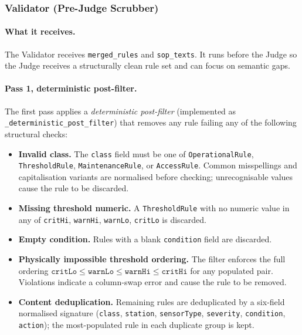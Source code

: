 ﻿\documentclass[11pt]{article}
\begin{document}
\subsubsection{Validator (Pre-Judge Scrubber)}
\label{sec:validator}

\paragraph{What it receives.}
The Validator receives \texttt{merged\_rules} and \texttt{sop\_texts}.  It runs
before the Judge so the Judge receives a structurally clean rule set and can focus
on semantic gaps.

\paragraph{Pass 1, deterministic post-filter.}
The first pass applies a \emph{deterministic post-filter} (implemented as
\texttt{\_deterministic\_post\_filter}) that removes any rule failing any of the
following structural checks:

\begin{itemize}
    \item \textbf{Invalid class.}  The \texttt{class} field must be one of
          \texttt{OperationalRule}, \texttt{ThresholdRule}, \texttt{MaintenanceRule},
          or \texttt{AccessRule}.  Common misspellings and capitalisation variants
          are normalised before checking; unrecognisable values cause the rule to
          be discarded.
    \item \textbf{Missing threshold numeric.}  A \texttt{ThresholdRule} with no
          numeric value in any of \texttt{critHi}, \texttt{warnHi}, \texttt{warnLo},
          \texttt{critLo} is discarded.
    \item \textbf{Empty condition.}  Rules with a blank \texttt{condition} field
          are discarded.
    \item \textbf{Physically impossible threshold ordering.}  The filter enforces
          the full ordering $\texttt{critLo} \leq \texttt{warnLo} \leq \texttt{warnHi}
          \leq \texttt{critHi}$ for any populated pair.  Violations indicate a
          column-swap error and cause the rule to be removed.
    \item \textbf{Content deduplication.}  Remaining rules are deduplicated by a
          six-field normalised signature (\texttt{class}, \texttt{station},
          \texttt{sensorType}, \texttt{severity}, \texttt{condition}, \texttt{action});
          the most-populated rule in each duplicate group is kept.
\end{itemize}
\end{document}
